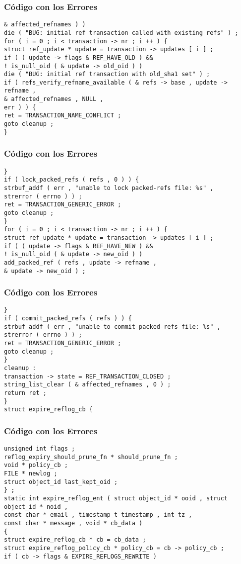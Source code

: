 \documentclass{beamer}
\begin{document}
\begin{frame}[fragile]
\frametitle{C\'odigo con los Errores}
\begin{verbatim}
& affected_refnames ) ) 
die ( "BUG: initial ref transaction called with existing refs" ) ; 
for ( i = 0 ; i < transaction -> nr ; i ++ ) { 
struct ref_update * update = transaction -> updates [ i ] ; 
if ( ( update -> flags & REF_HAVE_OLD ) && 
! is_null_oid ( & update -> old_oid ) ) 
die ( "BUG: initial ref transaction with old_sha1 set" ) ; 
if ( refs_verify_refname_available ( & refs -> base , update -> refname , 
& affected_refnames , NULL , 
err ) ) { 
ret = TRANSACTION_NAME_CONFLICT ; 
goto cleanup ; 
} 
\end{verbatim}
\end{frame}
\begin{frame}[fragile]
\frametitle{C\'odigo con los Errores}
\begin{verbatim}
} 
if ( lock_packed_refs ( refs , 0 ) ) { 
strbuf_addf ( err , "unable to lock packed-refs file: %s" , 
strerror ( errno ) ) ; 
ret = TRANSACTION_GENERIC_ERROR ; 
goto cleanup ; 
} 
for ( i = 0 ; i < transaction -> nr ; i ++ ) { 
struct ref_update * update = transaction -> updates [ i ] ; 
if ( ( update -> flags & REF_HAVE_NEW ) && 
! is_null_oid ( & update -> new_oid ) ) 
add_packed_ref ( refs , update -> refname , 
& update -> new_oid ) ; 
\end{verbatim}
\end{frame}
\begin{frame}[fragile]
\frametitle{C\'odigo con los Errores}
\begin{verbatim}
} 
if ( commit_packed_refs ( refs ) ) { 
strbuf_addf ( err , "unable to commit packed-refs file: %s" , 
strerror ( errno ) ) ; 
ret = TRANSACTION_GENERIC_ERROR ; 
goto cleanup ; 
} 
cleanup : 
transaction -> state = REF_TRANSACTION_CLOSED ; 
string_list_clear ( & affected_refnames , 0 ) ; 
return ret ; 
} 
struct expire_reflog_cb { 
\end{verbatim}
\end{frame}
\begin{frame}[fragile]
\frametitle{C\'odigo con los Errores}
\begin{verbatim}
unsigned int flags ; 
reflog_expiry_should_prune_fn * should_prune_fn ; 
void * policy_cb ; 
FILE * newlog ; 
struct object_id last_kept_oid ; 
} ; 
static int expire_reflog_ent ( struct object_id * ooid , struct object_id * noid , 
const char * email , timestamp_t timestamp , int tz , 
const char * message , void * cb_data ) 
{ 
struct expire_reflog_cb * cb = cb_data ; 
struct expire_reflog_policy_cb * policy_cb = cb -> policy_cb ; 
if ( cb -> flags & EXPIRE_REFLOGS_REWRITE ) 
\end{verbatim}
\end{frame}
\end{document}
